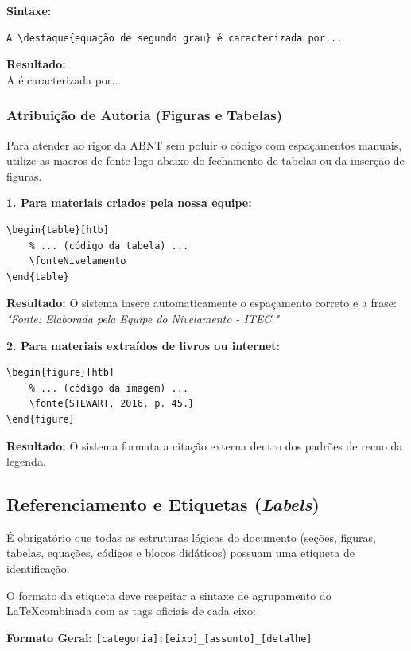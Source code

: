 \textbf{Sintaxe:}
\begin{verbatim}
A \destaque{equação de segundo grau} é caracterizada por...
\end{verbatim}

\textbf{Resultado:} \\
A  é caracterizada por...

\subsubsection{Atribuição de Autoria (Figuras e Tabelas)}

Para atender ao rigor da ABNT sem poluir o código com espaçamentos manuais, utilize as macros de fonte logo abaixo do fechamento de tabelas ou da inserção de figuras.

\textbf{1. Para materiais criados pela nossa equipe:}
\begin{verbatim}
\begin{table}[htb]
    % ... (código da tabela) ...
    \fonteNivelamento
\end{table}
\end{verbatim}
\textbf{Resultado:} O sistema insere automaticamente o espaçamento correto e a frase: \textit{"Fonte: Elaborada pela Equipe do Nivelamento - ITEC."}

\vspace{0.3cm}

\textbf{2. Para materiais extraídos de livros ou internet:}
\begin{verbatim}
\begin{figure}[htb]
    % ... (código da imagem) ...
    \fonte{STEWART, 2016, p. 45.}
\end{figure}
\end{verbatim}
\textbf{Resultado:} O sistema formata a citação externa dentro dos padrões de recuo da legenda.

\subsection{Referenciamento e Etiquetas (\textit{Labels})}

É obrigatório que todas as estruturas lógicas do documento (seções, figuras, tabelas, equações, códigos e blocos didáticos) possuam uma etiqueta de identificação.

O formato da etiqueta deve respeitar a sintaxe de agrupamento do \LaTeX combinada com as tags oficiais de cada eixo:

\begin{center}
    \textbf{Formato Geral:} \verb|[categoria]:[eixo]_[assunto]_[detalhe]|
\end{center}

